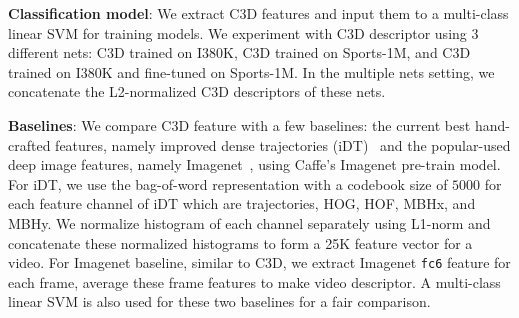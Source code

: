 \documentclass[10pt,twocolumn,letterpaper]{article}
\begin{document}
{\bf Classification model}: We extract C3D features and input them to a multi-class linear SVM for training models. We experiment with C3D descriptor using 3 different nets: C3D trained on I380K, C3D trained on Sports-1M, and C3D trained on I380K and fine-tuned on Sports-1M. In the multiple nets setting, we concatenate the L2-normalized C3D descriptors of these nets.

{\bf Baselines}: We compare C3D feature with a few baselines: the current best hand-crafted features, namely improved dense trajectories (iDT)~\cite{Wang2013} and the popular-used deep image features, namely Imagenet~\cite{jia2014caffe}, using Caffe's Imagenet pre-train model. For iDT, we use the bag-of-word representation with a codebook size of $5000$ for each feature channel of iDT which are trajectories, HOG, HOF, MBHx, and MBHy. We normalize histogram of each channel separately using L1-norm and concatenate these normalized histograms to form a 25K feature vector for a video. For Imagenet baseline, similar to C3D, we extract Imagenet \texttt{fc6} feature for each frame, average these frame features to make video descriptor. A multi-class linear SVM is also used for these two baselines for a fair comparison.
\end{document}
